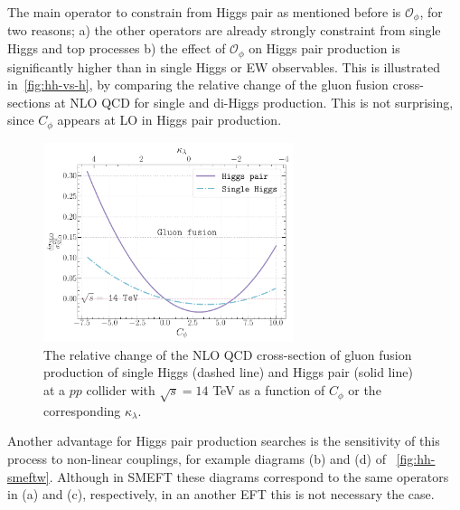 The main operator to constrain from Higgs pair as mentioned before is $\mathcal{O}_{\phi}$, for two reasons; a) the other operators are already strongly constraint from single Higgs and top processes b) the effect of $\mathcal{O}_{\phi}$ on Higgs pair production is significantly higher than in single Higgs or EW observables. This is illustrated in~\autoref{fig:hh-vs-h}, by comparing the relative change of the gluon fusion cross-sections at NLO QCD for single and di-Higgs production. This is not surprising, since $C_\phi$ appears at LO in Higgs pair production.
\begin{figure}[h!]
	\begin{center}
		\includegraphics[width=0.65\textwidth]{figures/trilinear_single_vs_double}
		\caption{ The relative change of the NLO QCD cross-section of gluon fusion production of single Higgs (dashed line) and Higgs pair (solid line) at a $pp$ collider with $\sqrt{s}=14$ TeV as a function of $C_\phi$ or the corresponding $\kappa_\lambda$. \label{fig:hh-vs-h} }
	\end{center}
\end{figure}
Another advantage for Higgs pair production searches is the sensitivity of this process to non-linear couplings, for example diagrams (b) and (d) of ~\autoref{fig:hh-smeftw}. Although in SMEFT these diagrams correspond to the same operators in (a) and (c), respectively, in an another EFT this is not necessary the case.\\
